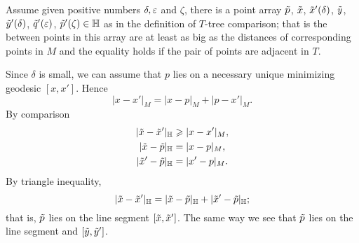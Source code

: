 \begin{wrapfigure}[7]{r}{26 mm}
\end{wrapfigure}

Assume given  positive numbers $\delta,\eps$ and $\zeta$, there is a point array $\~p$, $\~x$, $\~x'(\delta)$, $\~y$, $\~y'(\delta)$, $\~q'(\eps)$, $\~p'(\zeta)\in\HH$ as in the definition of $T$-tree comparison;
that is the between points in this array are at least as big as the distances of corresponding points in $M$ and the equality holds if the pair of points are adjacent in $T$.

Since $\delta$ is small, we can assume that $p$ lies on a necessary unique minimizing geodesic $[x,x']$.
Hence 
\[|x-x'|_M=|x-p|_M+|p-x'|_M.\]
By comparison
\begin{align*}
|\~x-\~x'|_\HH&\ge|x-x'|_M,
\\
|\~x-\~p|_\HH&=|x-p|_M,
\\
|\~x'-\~p|_\HH&=|x'-p|_M.
\end{align*}
By triangle inequality,
\[|\~x-\~x'|_\HH=|\~x-\~p|_\HH+|\~x'-\~p|_\HH;\]
that is, $\~p$ lies on the line segment $[\~x,\~x']$.
The same way we see that $\~p$ lies on the line segment and $[\~y,\~y']$.

